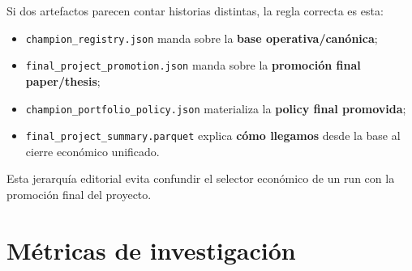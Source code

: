 \documentclass[
  spanish,
  11pt,
  letterpaper,
]{scrbook}
\providecommand{\tightlist}{%
  \setlength{\itemsep}{0pt}\setlength{\parskip}{0pt}}
\theoremstyle{plain}
\theoremstyle{remark}
\begin{document}
\begin{tcolorbox}[enhanced jigsaw, arc=.35mm, bottomrule=.15mm, bottomtitle=1mm, breakable, colback=white, colbacktitle=quarto-callout-note-color!10!white, colframe=quarto-callout-note-color-frame, coltitle=black, left=2mm, leftrule=.75mm, opacityback=0, opacitybacktitle=0.6, rightrule=.15mm, title=\textcolor{quarto-callout-note-color}{\faInfo}\hspace{0.5em}{Cómo resolver aparentes contradicciones entre artefactos}, titlerule=0mm, toprule=.15mm, toptitle=1mm]

Si dos artefactos parecen contar historias distintas, la regla correcta
es esta:

\begin{itemize}
\tightlist
\item
  \texttt{champion\_registry.json} manda sobre la \textbf{base
  operativa/canónica};
\item
  \texttt{final\_project\_promotion.json} manda sobre la
  \textbf{promoción final paper/thesis};
\item
  \texttt{champion\_portfolio\_policy.json} materializa la
  \textbf{policy final promovida};
\item
  \texttt{final\_project\_summary.parquet} explica \textbf{cómo
  llegamos} desde la base al cierre económico unificado.
\end{itemize}

Esta jerarquía editorial evita confundir el selector económico de un run
con la promoción final del proyecto.

\end{tcolorbox}

\section{Métricas de
investigación}\label{muxe9tricas-de-investigaciuxf3n}
\end{document}
